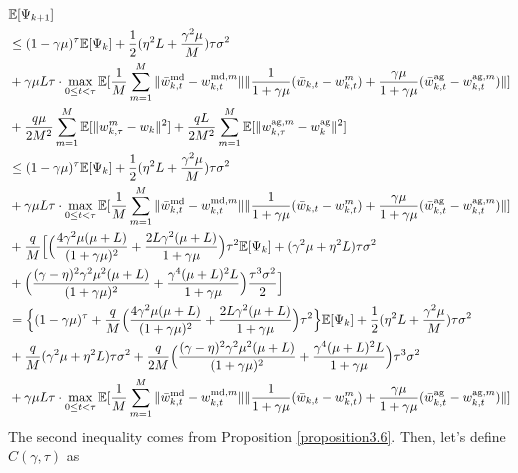 \begin{align*}
    &\mathbb{E}[\Psi_{k+1}] \\
    &\leq (1-\gamma\mu)^\tau \mathbb{E}[\Psi_k] + \frac{1}{2}(\eta^2 L + \frac{\gamma^2\mu}{M})\tau\sigma^2 \\
    &+ \gamma\mu L \tau \cdot \max_{0\leq t <\tau} \mathbb{E}[\frac{1}{M} \sum_{m=1}^M \|\Bar{w}_{k, t}^{\textrm{md}} - w_{k, t}^{\textrm{md}, m}\|\|\frac{1}{1+\gamma\mu}(\Bar{w}_{k, t} - w_{k, t}^m) + \frac{\gamma\mu}{1+\gamma\mu}(\Bar{w}_{k, t}^{\textrm{ag}} - w_{k, t}^{\textrm{ag}, m})\|] \\
    &+ \frac{q\mu}{2M^2}\sum_{m=1}^M \mathbb{E}[\|w_{k, \tau}^m - w_k\|^2] + \frac{qL}{2M^2} \sum_{m=1}^M \mathbb{E}[\|w_{k, \tau}^{\textrm{ag}, m} - w_k^{\textrm{ag}}\|^2] \\
    &\leq (1-\gamma\mu)^\tau \mathbb{E}[\Psi_k] + \frac{1}{2}(\eta^2 L + \frac{\gamma^2\mu}{M})\tau\sigma^2 \\
    &+ \gamma\mu L \tau \cdot \max_{0\leq t <\tau} \mathbb{E}[\frac{1}{M} \sum_{m=1}^M \|\Bar{w}_{k, t}^{\textrm{md}} - w_{k, t}^{\textrm{md}, m}\|\|\frac{1}{1+\gamma\mu}(\Bar{w}_{k, t} - w_{k, t}^m) + \frac{\gamma\mu}{1+\gamma\mu}(\Bar{w}_{k, t}^{\textrm{ag}} - w_{k, t}^{\textrm{ag}, m})\|] \\
    &+ \frac{q}{M}\Big[ \Big( \frac{4\gamma^2\mu(\mu+L)}{(1+\gamma\mu)^2} + \frac{2L\gamma^2(\mu+L)}{1+\gamma\mu}\Big)\tau^2 \mathbb{E}[\Psi_k] + (\gamma^2\mu+\eta^2 L)\tau\sigma^2 \\
    &+ \Big( \frac{(\gamma-\eta)^2\gamma^2\mu^2(\mu+L)}{(1+\gamma\mu)^2} + \frac{\gamma^4(\mu+L)^2 L}{1+\gamma\mu} \Big) \frac{\tau^3\sigma^2}{2}\Big] \\
    &= \Big\{(1-\gamma\mu)^\tau + \frac{q}{M}\Big( \frac{4\gamma^2\mu(\mu + L)}{(1+\gamma\mu)^2} + \frac{2L\gamma^2(\mu+L)}{1+\gamma\mu}\Big)\tau^2\Big\} \mathbb{E}[\Psi_k] + \frac{1}{2}(\eta^2 L+\frac{\gamma^2\mu}{M})\tau\sigma^2\\
     &+ \frac{q}{M}(\gamma^2\mu+\eta^2 L)\tau\sigma^2 + \frac{q}{2M}\Big(\frac{(\gamma-\eta)^2\gamma^2\mu^2(\mu+L)}{(1+\gamma\mu)^2} + \frac{\gamma^4(\mu+L)^2 L}{1+\gamma\mu}\Big)\tau^3\sigma^2\\
     &+ \gamma\mu L \tau \cdot \max_{0\leq t <\tau} \mathbb{E}[\frac{1}{M} \sum_{m=1}^M \|\Bar{w}_{k, t}^{\textrm{md}} - w_{k, t}^{\textrm{md}, m}\|\|\frac{1}{1+\gamma\mu}(\Bar{w}_{k, t} - w_{k, t}^m) + \frac{\gamma\mu}{1+\gamma\mu}(\Bar{w}_{k, t}^{\textrm{ag}} - w_{k, t}^{\textrm{ag}, m})\|]
\end{align*}
The second inequality comes from Proposition \ref{proposition3.6}. Then, let's define $C(\gamma, \tau)$ as
